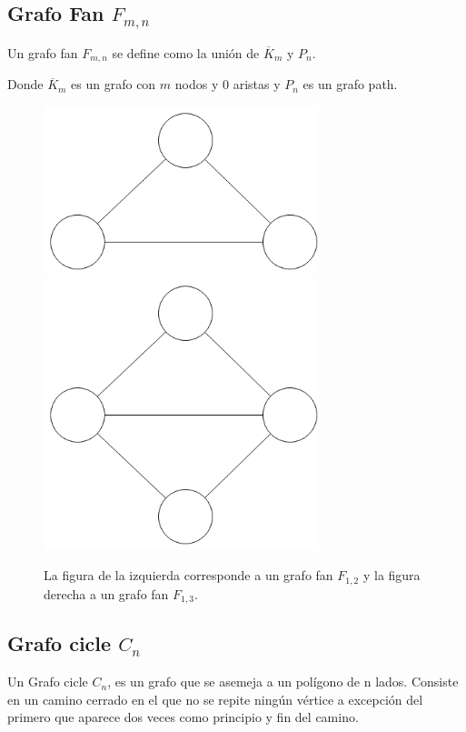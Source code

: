 \subsection{Grafo Fan $F_{m,n}$}
Un grafo fan $F_{m,n}$ se define como la unión de $\overline{K}_m$ y $P_n$.

Donde $\overline{K}_m$ es un grafo con $m$ nodos y 0 aristas y $P_n$ es un grafo path.

\begin{figure}[H]
\includegraphics[width=80mm]{F1_2.png}
\includegraphics[width=80mm]{F1_3.png}
\caption{La figura de la izquierda corresponde a un grafo fan $F_{1,2}$ y la figura derecha a un grafo fan $F_{1,3}$.}
\label{overflow}
\end{figure}

\subsection{Grafo cicle $C_n$}
Un Grafo cicle $C_n$, es un grafo que se asemeja a un polígono de n lados. Consiste en un camino cerrado en el que no se repite ningún vértice a excepción del primero que aparece dos veces como principio y fin del camino. 

